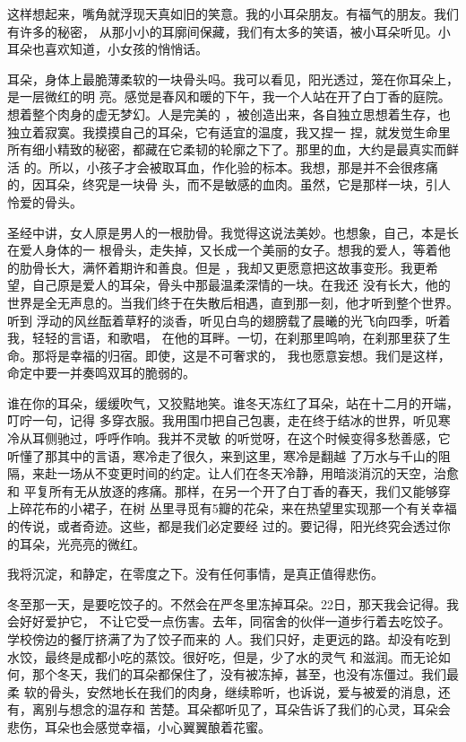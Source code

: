 \documentclass[12pt,a4paper]{article}
\begin{document}
		这样想起来，嘴角就浮现天真如旧的笑意。我的小耳朵朋友。有福气的朋友。我们有许多的秘密，
	从那小小的耳廓间保藏，我们有太多的笑语，被小耳朵听见。小耳朵也喜欢知道，小女孩的悄悄话。


		耳朵，身体上最脆薄柔软的一块骨头吗。我可以看见，阳光透过，笼在你耳朵上，是一层微红的明
	亮。感觉是春风和暖的下午，我一个人站在开了白丁香的庭院。想着整个肉身的虚无梦幻。人是完美的
	，被创造出来，各自独立思想着生存，也独立着寂寞。我摸摸自己的耳朵，它有适宜的温度，我又捏一
	捏，就发觉生命里所有细小精致的秘密，都藏在它柔韧的轮廓之下了。那里的血，大约是最真实而鲜活
	的。所以，小孩子才会被取耳血，作化验的标本。我想，那是并不会很疼痛的，因耳朵，终究是一块骨
	头，而不是敏感的血肉。虽然，它是那样一块，引人怜爱的骨头。


		圣经中讲，女人原是男人的一根肋骨。我觉得这说法美妙。也想象，自己，本是长在爱人身体的一
	根骨头，走失掉，又长成一个美丽的女子。想我的爱人，等着他的肋骨长大，满怀着期许和善良。但是
	，我却又更愿意把这故事变形。我更希望，自己原是爱人的耳朵，骨头中那最温柔深情的一块。在我还
	没有长大，他的世界是全无声息的。当我们终于在失散后相遇，直到那一刻，他才听到整个世界。听到
	浮动的风丝酝着草籽的淡香，听见白鸟的翅膀载了晨曦的光飞向四季，听着我，轻轻的言语，和歌唱，
	在他的耳畔。一切，在刹那里鸣响，在刹那里获了生命。那将是幸福的归宿。即使，这是不可奢求的，
	我也愿意妄想。我们是这样，命定中要一并奏鸣双耳的脆弱的。


		谁在你的耳朵，缓缓吹气，又狡黠地笑。谁冬天冻红了耳朵，站在十二月的开端，叮咛一句，记得
	多穿衣服。我用围巾把自己包裹，走在终于结冰的世界，听见寒冷从耳侧驰过，呼呼作响。我并不灵敏
	的听觉呀，在这个时候变得多愁善感，它听懂了那其中的言语，寒冷走了很久，来到这里，寒冷是翻越
	了万水与千山的阻隔，来赴一场从不变更时间的约定。让人们在冬天冷静，用暗淡消沉的天空，治愈和
	平复所有无从放逐的疼痛。那样，在另一个开了白丁香的春天，我们又能够穿上碎花布的小裙子，在树
	丛里寻觅有5瓣的花朵，来在热望里实现那一个有关幸福的传说，或者奇迹。这些，都是我们必定要经
	过的。要记得，阳光终究会透过你的耳朵，光亮亮的微红。


		我将沉淀，和静定，在零度之下。没有任何事情，是真正值得悲伤。


		冬至那一天，是要吃饺子的。不然会在严冬里冻掉耳朵。22日，那天我会记得。我会好好爱护它，
	不让它受一点伤害。去年，同宿舍的伙伴一道步行着去吃饺子。学校傍边的餐厅挤满了为了饺子而来的
	人。我们只好，走更远的路。却没有吃到水饺，最终是成都小吃的蒸饺。很好吃，但是，少了水的灵气
	和滋润。而无论如何，那个冬天，我们的耳朵都保住了，没有被冻掉，甚至，也没有冻僵过。我们最柔
	软的骨头，安然地长在我们的肉身，继续聆听，也诉说，爱与被爱的消息，还有，离别与想念的温存和
	苦楚。耳朵都听见了，耳朵告诉了我们的心灵，耳朵会悲伤，耳朵也会感觉幸福，小心翼翼酿着花蜜。
\end{document}
